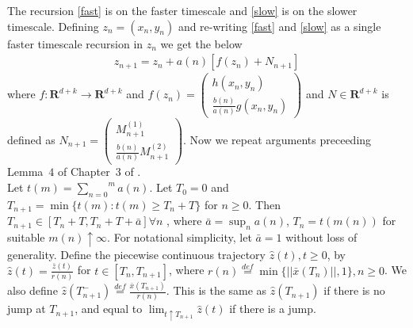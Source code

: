 \begin{comment}
\end{lemma}
\begin{proof}
Follows in the same manner as Lemma~$3$ of Chapter~$3$ of \cite{SA}
\end{proof}
\begin{corollary}\label{c_0}
For any fixed $y$, there exists $c_0(y)>0$ and $T>0$ such that for all initial conditions $x$ on the unit sphere, $||\Phi^y_c(t,x)||<\frac{1}{4}$ for $t\in[T,T+1]$ and $c>c_0(y)$
\end{corollary}
\begin{proof}
Follows from proof of Corollary~$3$ of Chapter~$3$ of \cite{SA}.
\end{proof}\\
We make the following assumption w.r.t to the constant $c_0(y)$ used in Corollary~\ref{c_0}
\begin{assumption}
For any $y \in \mathbf{R}^k$, $c_0(y) \leq K(1+||y||)$
\end{assumption}
\end{comment}
The recursion \eqref{fast} is on the faster timescale and \eqref{slow} is on the slower timescale. Defining $z_n=(x_n,y_n)$ and re-writing \eqref{fast} and \eqref{slow} as a single faster timescale recursion in $z_n$ we get the below
\begin{align}
\label{combo}z_{n+1}=z_n+a(n)[f(z_n)+N_{n+1}]
\end{align}
where $f\colon\mathbf{R}^{d+k} \rightarrow \mathbf{R}^{d+k}$ and $f(z_n)=\left({\begin{array}{c} h(x_n,y_n) \\ \frac{b(n)}{a(n)}g(x_n,y_n) \end{array}}\right)$ and $N \in \mathbf{R}^{d+k}$ is defined as $N_{n+1}=\left({\begin{array}{c}M^{(1)}_{n+1}\\ \frac{b(n)}{a(n)}M^{(2)}_{n+1}\end{array}} \right)$. Now we repeat arguments preceeding Lemma~$4$ of Chapter~$3$ of \cite{SA}.\\
Let $t(m)=\overset{m}{\underset{n=0}{\sum}}a(n)$. Let $T_0=0$ and $T_{n+1}=\min\{t(m)\colon t(m)\geq T_n+T\}$ for $n\geq 0$. Then $T_{n+1}\in [T_n+T,T_n+T+\bar{a}] \forall n$  , where $\bar{a}=\sup_n a(n)$, $T_n=t(m(n))$ for suitable $m(n) \uparrow \infty$. For notational simplicity, let $\bar{a}=1$ without loss of generality. Define the piecewise continuous trajectory $\hat{z}(t),t\geq 0$, by $\hat{z}(t)=\frac{\bar{z}(t)}{r(n)}$ for $t\in[T_n,T_{n+1}]$, where $r(n)\stackrel{def}{=}\min\{||\bar{x}(T_n)||,1\}, n\geq 0$. We also define $\hat{z}(T^-_{n+1})\stackrel{def}{=}\frac{\bar{x}(T_{n+1})}{r(n)}$. This is the same as $\hat{z}(T_{n+1})$ if there is no jump at $T_{n+1}$, and equal to $\lim_{t\uparrow T_{n+1}}\hat{z}(t)$ if there is a jump.

